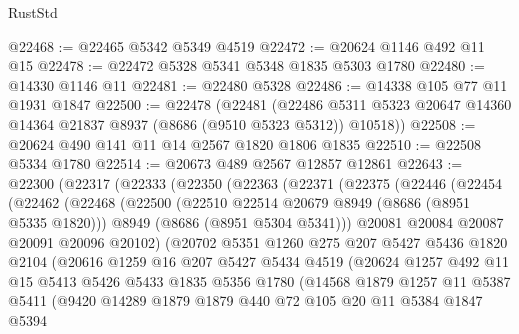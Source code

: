 \begin{lexlean}{RustStd}
\begin{coremodule}
@22468 := @22465 @5342 @5349 @4519
@22472 := @20624 @1146 @492 @11 @15
@22478 := @22472 @5328 @5341 @5348 @1835 @5303 @1780
@22480 := @14330 @1146 @11
@22481 := @22480 @5328
@22486 := @14338 @105 @77 @11 @1931 @1847
@22500 := @22478
    (@22481
      (@22486 @5311 @5323 @20647 @14360 @14364 @21837 @8937 (@8686 (@9510 @5323 @5312)) @10518))
@22508 := @20624 @490 @141 @11 @14 @2567 @1820 @1806 @1835
@22510 := @22508 @5334 @1780
@22514 := @20673 @489 @2567 @12857 @12861
@22643 := @22300
    (@22317
      (@22333
        (@22350
          (@22363
            (@22371
              (@22375
                (@22446
                  (@22454
                    (@22462
                      (@22468
                        (@22500
                          (@22510 @22514 @20679 @8949 (@8686 (@8951 @5335 @1820)))
                          @8949
                          (@8686 (@8951 @5304 @5341)))
                        @20081
                        @20084
                        @20087
                        @20091
                        @20096
                        @20102)
                      (@20702
                        @5351
                        @1260
                        @275
                        @207
                        @5427
                        @5436
                        @1820
                        @2104
                        (@20616
                          @1259
                          @16
                          @207
                          @5427
                          @5434
                          @4519
                          (@20624
                            @1257
                            @492
                            @11
                            @15
                            @5413
                            @5426
                            @5433
                            @1835
                            @5356
                            @1780
                            (@14568
                              @1879
                              @1257
                              @11
                              @5387
                              @5411
                              (@9420
                                @14289
                                @1879
                                @1879
                                @440
                                @72
                                @105
                                @20
                                @11
                                @5384
                                @1847
                                @5394

\end{coremodule}
\end{lexlean}
